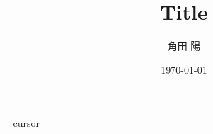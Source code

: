 \documentclass[a4paper, fontsize=9pt, jafontsize=9pt, baselineskip=11pt, twocolumn]{jlreq}
\title{Title}
\author{角田 陽}
\date{\today}
\begin{document}
\maketitle
{{_cursor_}}
\end{document}
